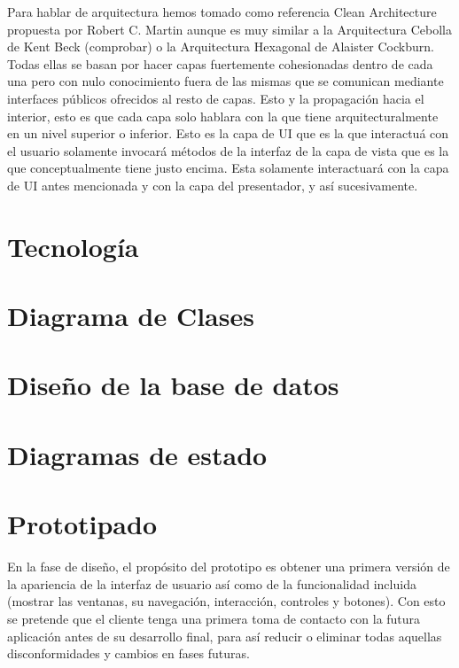 \documentclass[../pfc.tex]{subfiles}
\begin{document}
	Para hablar de arquitectura hemos tomado como referencia Clean Architecture\cite{cleanarch} propuesta por Robert C. Martin aunque es muy similar a la Arquitectura Cebolla de Kent Beck (comprobar) o la Arquitectura Hexagonal de Alaister Cockburn. Todas ellas se basan por hacer capas fuertemente cohesionadas dentro de cada una pero con nulo conocimiento fuera de las mismas que se comunican mediante interfaces públicos ofrecidos al resto de capas. Esto y la propagación hacia el interior, esto es que cada capa solo hablara con la que tiene arquitecturalmente en un nivel superior o inferior. Esto es la capa de UI que es la que interactuá con el usuario solamente invocará métodos de la interfaz de la capa de vista que es la que conceptualmente tiene justo encima. Esta solamente interactuará con la capa de UI antes mencionada y con la capa del presentador, y así sucesivamente. 
	
	
	
	\section{Tecnología}
	
	\section{Diagrama de Clases}
	
	\section{Diseño de la base de datos}
	
	\section{Diagramas de estado}
	
	\section{Prototipado}
	
	En la fase de diseño, el propósito del prototipo es obtener una primera versión de la apariencia de la interfaz de usuario así como de la funcionalidad incluida (mostrar las ventanas, su navegación, interacción, controles y botones). Con esto se pretende que el cliente tenga una primera toma de contacto con la futura aplicación antes de su desarrollo final, para así reducir o eliminar todas aquellas disconformidades y cambios en fases futuras.
	
\end{document}
